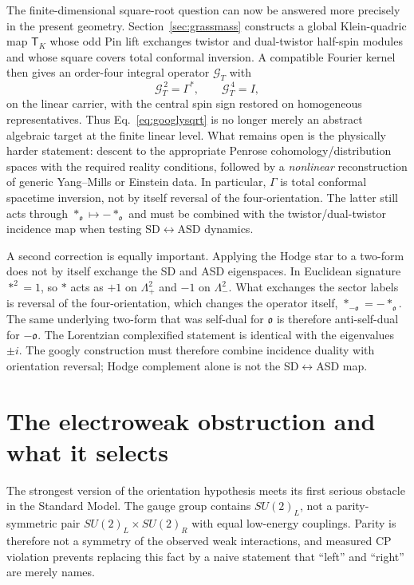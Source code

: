 \documentclass[11pt]{article}
\theoremstyle{definition}\newtheorem{definition}[theorem]{Definition}
\theoremstyle{remark}\newtheorem{remark}[theorem]{Remark}\newtheorem{conjecture}[theorem]{Conjecture}
\begin{document}
The finite-dimensional square-root question can now be answered more precisely in the present geometry. Section~\ref{sec:grassmass} constructs a global Klein-quadric map $\mathsf T_K$ whose odd Pin lift exchanges twistor and dual-twistor half-spin modules and whose square covers total conformal inversion. A compatible Fourier kernel then gives an order-four integral operator $\mathcal G_T$ with
\begin{equation}\label{eq:googlysqrt}
 \boxed{\mathcal G_T^{\,2}=\Gamma^*,\qquad \mathcal G_T^{\,4}=I,}
\end{equation}
on the linear carrier, with the central spin sign restored on homogeneous representatives. Thus Eq.~\eqref{eq:googlysqrt} is no longer merely an abstract algebraic target at the finite linear level. What remains open is the physically harder statement: descent to the appropriate Penrose cohomology/distribution spaces with the required reality conditions, followed by a \emph{nonlinear} reconstruction of generic Yang--Mills or Einstein data. In particular, $\Gamma$ is total conformal spacetime inversion, not by itself reversal of the four-orientation. The latter still acts through $*_{\mathfrak o}\mapsto-*_{\mathfrak o}$ and must be combined with the twistor/dual-twistor incidence map when testing SD$\leftrightarrow$ASD dynamics.

A second correction is equally important. Applying the Hodge star to a two-form does not by itself exchange the SD and ASD eigenspaces. In Euclidean signature $*^2=1$, so $*$ acts as $+1$ on $\Lambda^2_+$ and $-1$ on $\Lambda^2_-$. What exchanges the sector labels is reversal of the four-orientation, which changes the operator itself, $*_{-\mathfrak o}=-*_{\mathfrak o}$. The same underlying two-form that was self-dual for $\mathfrak o$ is therefore anti-self-dual for $-\mathfrak o$. The Lorentzian complexified statement is identical with the eigenvalues $\pm i$. The googly construction must therefore combine incidence duality with orientation reversal; Hodge complement alone is not the SD$\leftrightarrow$ASD map.

\section{The electroweak obstruction and what it selects}
The strongest version of the orientation hypothesis meets its first serious obstacle in the Standard Model. The gauge group contains $SU(2)_L$, not a parity-symmetric pair $SU(2)_L\times SU(2)_R$ with equal low-energy couplings. Parity is therefore not a symmetry of the observed weak interactions, and measured CP violation prevents replacing this fact by a naive statement that ``left'' and ``right'' are merely names.
\end{document}
